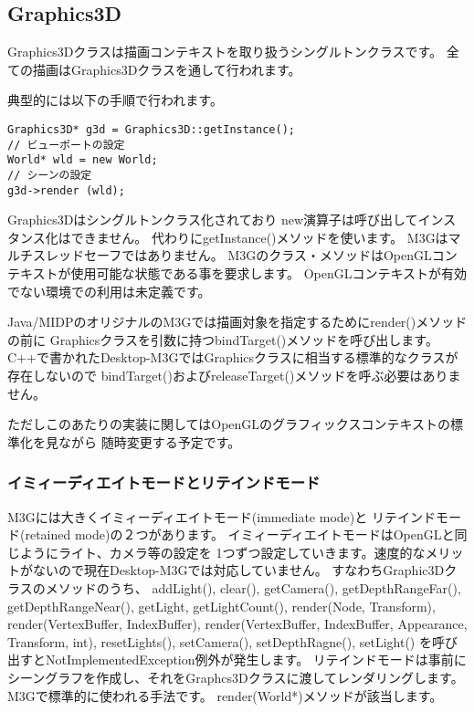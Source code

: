 \subsection{Graphics3D}

Graphics3Dクラスは描画コンテキストを取り扱うシングルトンクラスです。
全ての描画はGraphics3Dクラスを通して行われます。

典型的には以下の手順で行われます。

\begin{verbatim}
Graphics3D* g3d = Graphics3D::getInstance();
// ビューポートの設定
World* wld = new World;
// シーンの設定
g3d->render (wld);
\end{verbatim}

Graphics3Dはシングルトンクラス化されており
new演算子は呼び出してインスタンス化はできません。
代わりにgetInstance()メソッドを使います。
M3Gはマルチスレッドセーフではありません。
M3Gのクラス・メソッドはOpenGLコンテキストが使用可能な状態である事を要求します。
OpenGLコンテキストが有効でない環境での利用は未定義です。

Java/MIDPのオリジナルのM3Gでは描画対象を指定するためにrender()メソッドの前に
Graphicsクラスを引数に持つbindTarget()メソッドを呼び出します。
C++で書かれたDesktop-M3GではGraphicsクラスに相当する標準的なクラスが存在しないので
bindTarget()およびreleaseTarget()メソッドを呼ぶ必要はありません。

ただしこのあたりの実装に関してはOpenGLのグラフィックスコンテキストの標準化を見ながら
随時変更する予定です。




\subsubsection{イミィーディエイトモードとリテインドモード}
M3Gには大きくイミィーディエイトモード(immediate mode)と
リテインドモード(retained mode)の２つがあります。
イミィーディエイトモードはOpenGLと同じようにライト、カメラ等の設定を
1つずつ設定していきます。速度的なメリットがないので現在Desktop-M3Gでは対応していません。
すなわちGraphic3Dクラスのメソッドのうち、
addLight(), clear(), getCamera(), getDepthRangeFar(), 
getDepthRangeNear(), getLight, getLightCount(), 
render(Node, Transform), render(VertexBuffer, IndexBuffer),
render(VertexBuffer, IndexBuffer, Appearance, Transform, int),
resetLights(), setCamera(), setDepthRagne(), setLight()
を呼び出すとNotImplementedException例外が発生します。
リテインドモードは事前にシーングラフを作成し、それをGraphcs3Dクラスに渡してレンダリングします。M3Gで標準的に使われる手法です。
render(World*)メソッドが該当します。


